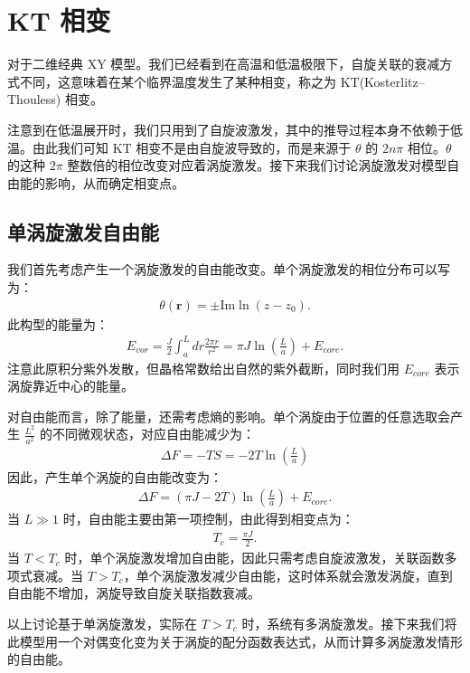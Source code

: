 \documentclass[10pt,UTF8]{ctexart}
\begin{document}
\section*{KT 相变}
\noindent
对于二维经典 XY 模型。我们已经看到在高温和低温极限下，自旋关联的衰减方式不同，这意味着在某个临界温度发生了某种相变，称之为 KT(Kosterlitz–Thouless) 相变。

注意到在低温展开时，我们只用到了自旋波激发，其中的推导过程本身不依赖于低温。由此我们可知 KT 相变不是由自旋波导致的，而是来源于 $\theta$ 的 $2n\pi$ 相位。$\theta$ 的这种 $2\pi$ 整数倍的相位改变对应着涡旋激发。接下来我们讨论涡旋激发对模型自由能的影响，从而确定相变点。

\subsection*{单涡旋激发自由能}
\noindent
我们首先考虑产生一个涡旋激发的自由能改变。单个涡旋激发的相位分布可以写为：
\begin{eqnarray}
	\theta(\bm r) = \pm \mathrm{Im} \ln(z-z_0).
\end{eqnarray}
此构型的能量为：
\begin{eqnarray}
	E_{vor} = \frac{J}{2} \int_a^{L} dr\frac{2\pi r}{r^2}
	= \pi J \ln\left(\frac{L}{a} \right) + E_{core}.
\end{eqnarray}
注意此原积分紫外发散，但晶格常数给出自然的紫外截断，同时我们用 $E_{core}$ 表示涡旋靠近中心的能量。

对自由能而言，除了能量，还需考虑熵的影响。单个涡旋由于位置的任意选取会产生 $\frac{L^2}{a^2}$ 的不同微观状态，对应自由能减少为：
\begin{eqnarray}
	\Delta F = -T S = -2T \ln \left(\frac{L}{a} \right)
\end{eqnarray}
因此，产生单个涡旋的自由能改变为：
\begin{eqnarray}
	\Delta F = (\pi J - 2T)\ln \left(\frac{L}{a} \right) + E_{core}.
\end{eqnarray}
当 $L \gg 1$ 时，自由能主要由第一项控制，由此得到相变点为：
\begin{eqnarray}
	T_c = \frac{\pi J}{2}.
\end{eqnarray}
当 $T<T_c$ 时，单个涡旋激发增加自由能，因此只需考虑自旋波激发，关联函数多项式衰减。当 $T>T_c$，单个涡旋激发减少自由能，这时体系就会激发涡旋，直到自由能不增加，涡旋导致自旋关联指数衰减。

以上讨论基于单涡旋激发，实际在 $T>T_c$ 时，系统有多涡旋激发。接下来我们将此模型用一个对偶变化变为关于涡旋的配分函数表达式，从而计算多涡旋激发情形的自由能。
\end{document}
